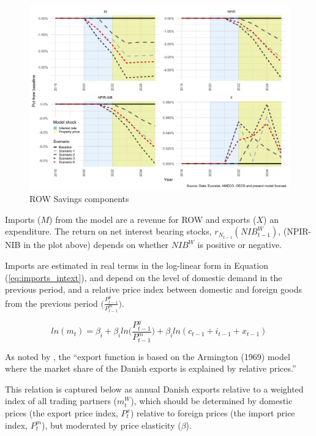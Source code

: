 \documentclass[
]{book}
\begin{document}
\begin{figure}[H]
\includegraphics[width=0.95\linewidth]{figures/fl-fi-sfc-plot-row-indicators-savings-1} \caption{ROW Savings components}\label{fig:fl-fi-sfc-plot-row-indicators-savings}
\end{figure}

Imports (\(M\)) from the model are a revenue for ROW and exports (\(X\)) an expenditure. The return on net interest bearing stocks, \(r_{N_{t-1}}(NIB^W_{t-1})\), (NPIR-NIB in the plot above) depends on whether \(NIB^W\) is positive or negative.

Imports are estimated in real terms in the log-linear form in Equation (\ref{eq:imports_intext}), and depend on the level of domestic demand in the previous period, and a relative price index between domestic and foreign goods from the previous period \(\Bigg( \frac{P^y_{t-1}}{P^m_{t-1}} \Bigg)\).

\begin{equation}
ln(m_t) = \beta _i + \beta _iln \Bigg( \frac{P^y_{t-1}}{P^m_{t-1}} \Bigg) + \beta _iln(c_{t-1} + i_{t-1} + x_{t-1})
\label{eq:imports_intext}
\end{equation}

As noted by \citet{byrialsenraza2019empirical}, the ``export function is based on the
Armington (1969) model where the market share of the Danish exports is explained by
relative prices.''

This relation is captured below as annual Danish exports relative to a weighted index
of all trading partners (\(m^W_t\)), which should be determined by domestic prices
(the export price index, \(P^x_t\)) relative to foreign prices (the import price
index, \(P^m_t\)), but moderated by price elasticity (\(\beta\)).
\end{document}
